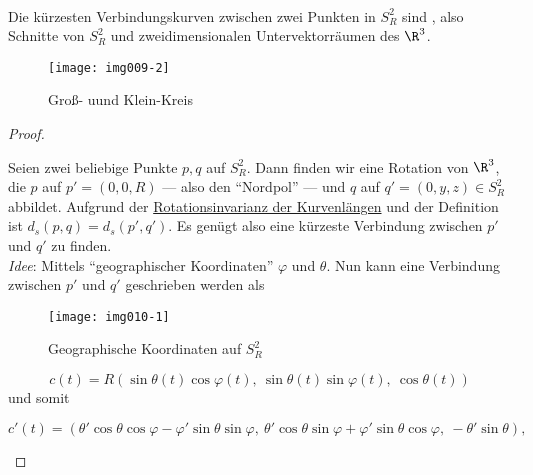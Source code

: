 \begin{lemma}
  \ \\
  \begin{minipage}{.45\textwidth}
    Die kürzesten Verbindungskurven zwischen zwei Punkten in $ S^2_R $ sind , also Schnitte von $ S^2_R $ und zweidimensionalen Untervektorräumen des $ \R^3 $.
  \end{minipage}
  \hfill
  \begin{minipage}{.45\textwidth}
    \begin{figure}[H]
      \label{img009-2}
      \texttt{[image: img009-2]}
      \caption{Groß- uund Klein-Kreis}
    \end{figure}
  \end{minipage}
  \begin{proof}
    \ \\
    \begin{minipage}{.45\textwidth}
      Seien zwei beliebige Punkte $ p,q $ auf $ S^2_R $. Dann finden wir eine Rotation von $ \R^3 $, die $ p $ auf $ p' = (0,0,R) $ --- also den ``Nordpol'' --- und $ q $ auf $ q' = (0,y,z) \in S^2_R $ abbildet. Aufgrund der \hyperref[lemma:kurvenlaengen]{Rotationsinvarianz der Kurvenlängen} und der Definition ist $ d_s(p,q) = d_s(p', q') $. Es genügt also eine kürzeste Verbindung zwischen $ p' $ und $ q' $ zu finden. \\
      \emph{Idee}: Mittels ``geographischer Koordinaten'' $ \varphi $ und $ \theta $. Nun kann eine Verbindung zwischen $ p' $ und $ q' $ geschrieben werden als
    \end{minipage}
    \hfill
    \begin{minipage}{.45\textwidth}
      \begin{figure}[H]
        \label{img010-1}
        \texttt{[image: img010-1]}
        \caption{Geographische Koordinaten auf $ S_R^2 $}
      \end{figure}
    \end{minipage}
    \begin{equation*}
      c(t) = R(\sin\theta(t)\cos\varphi(t), \ \sin\theta(t)\sin\varphi(t), \ \cos\theta(t))
    \end{equation*}
    und somit
    \begin{small}
      \begin{equation*}
        c'(t) = (\theta'\cos\theta\cos\varphi-\varphi'\sin\theta\sin\varphi, \ \theta'\cos\theta\sin\varphi+\varphi'\sin\theta\cos\varphi, \ -\theta'\sin\theta)\text{,}

\end{equation*}
\end{small}
\end{proof}
\end{lemma}
